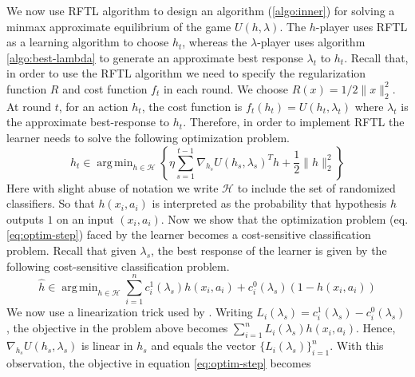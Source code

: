 \documentclass{article}
\renewcommand{\hat}{\widehat}
\DeclareMathOperator*{\argmin}{arg\,min}
\newcommand{\WW}{\mathcal{W}}
\newcommand{\HH}{\mathcal{H}}
\newcommand{\eps}{\varepsilon}
\newcommand{\norm}[1]{\lVert #1 \rVert}
\begin{document}
We now use RFTL algorithm to design an algorithm (\ref{algo:inner}) for solving a minmax approximate equilibrium of the game $U(h,\lambda)$. 
The $h$-player uses RFTL as a learning algorithm to choose $h_t$, whereas the $\lambda$-player uses algorithm \ref{algo:best-lambda} to generate an approximate best response $\lambda_t$ to $h_t$. Recall that, in order to use the RFTL algorithm we need to specify the regularization function $R$ and cost function $f_t$ in each round. We choose $R(x) = 1/2\norm{x}_2^2$. At round $t$, for an action $h_t$, the cost function is $f_t(h_t) = U(h_t,\lambda_t)$ where $\lambda_t$ is the approximate best-response to $h_t$. Therefore, in order to implement RFTL the learner needs to solve the following optimization problem. 
\begin{equation}\label{eq:optim-step}
h_t \in \argmin_{h \in \HH}\left\{\eta \sum_{s=1}^{t-1}\nabla_{h_s} U(h_s,\lambda_s)^T h + \frac{1}{2}\norm{h}_2^2\right\}
\end{equation}
Here with slight abuse of notation we write $\HH$ to include the set of randomized classifiers. So that $h(x_i,a_i)$ is interpreted as the probability that hypothesis $h$ outputs $1$ on an input $(x_i,a_i)$. Now we show that the optimization problem (eq. \ref{eq:optim-step}) faced by the learner becomes a cost-sensitive classification problem. Recall that given $\lambda_s$, the best response of the learner is given by the following cost-sensitive classification problem.
\begin{equation*}
\hat{h} \in \argmin_{h \in \HH} \sum_{i=1}^n c^1_i (\lambda_s) h(x_i,a_i) + c^0_i(\lambda_s) (1 - h(x_i,a_i))
\end{equation*}
We now use a linearization trick used by \cite{KNRZ17}.
Writing $L_i(\lambda_s) = c^1_i(\lambda_s) - c^0_i(\lambda_s)$, the objective in the problem above becomes $\sum_{i=1}^n L_i(\lambda_s) h(x_i,a_i)$. Hence, $\nabla_{h_s}U(h_s,\lambda_s)$ is linear in $h_s$ and equals the vector $\{L_i(\lambda_s)\}_{i=1}^n$. With this observation, the objective in equation \ref{eq:optim-step} becomes
\end{document}
